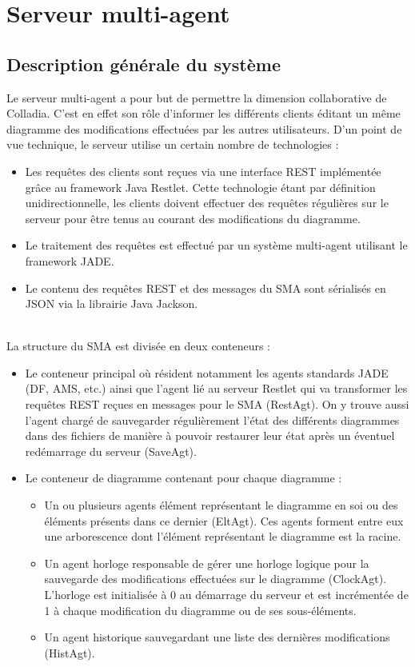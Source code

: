 \newpage
\section{Serveur multi-agent}
\subsection{Description générale du système}
Le serveur multi-agent a pour but de permettre la dimension collaborative de Colladia.
C'est en effet son rôle d'informer les différents clients éditant un même diagramme des modifications effectuées par les autres utilisateurs.
D'un point de vue technique, le serveur utilise un certain nombre de technologies :
\begin{itemize}
	\item Les requêtes des clients sont reçues via une interface REST implémentée grâce au framework Java Restlet. Cette technologie étant par définition unidirectionnelle, les clients doivent effectuer des requêtes régulières sur le serveur pour être tenus au courant des modifications du diagramme.
	\item Le traitement des requêtes est effectué par un système multi-agent utilisant le framework JADE.
	\item Le contenu des requêtes REST et des messages du SMA sont sérialisés en JSON via la librairie Java Jackson.
\end{itemize}
~\\
La structure du SMA est divisée en deux conteneurs :
\begin{itemize}
	\item Le conteneur principal où résident notamment les agents standards JADE (DF, AMS, etc.) ainsi que l'agent lié au serveur Restlet qui va transformer les requêtes REST reçues en messages pour le SMA (RestAgt). On y trouve aussi l'agent chargé de sauvegarder régulièrement l'état des différents diagrammes dans des fichiers de manière à pouvoir restaurer leur état après un éventuel redémarrage du serveur (SaveAgt).
	\item Le conteneur de diagramme contenant pour chaque diagramme :
	\begin{itemize}
		\item Un ou plusieurs agents élément représentant le diagramme en soi ou des éléments présents dans ce dernier (EltAgt). Ces agents forment entre eux une arborescence dont l'élément représentant le diagramme est la racine.
		\item Un agent horloge responsable de gérer une horloge logique pour la sauvegarde des modifications effectuées sur le diagramme (ClockAgt). L'horloge est initialisée à 0 au démarrage du serveur et est incrémentée de 1 à chaque modification du diagramme ou de ses sous-éléments.
		\item Un agent historique sauvegardant une liste des dernières modifications (HistAgt).
	\end{itemize}
\end{itemize}

